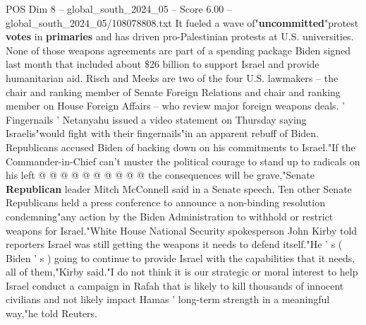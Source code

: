 \begin{textsample}{POS Dim 8 – global\_south\_2024\_05 – Score 6.00 – global\_south\_2024\_05/108078808.txt}
It fueled a wave of"\textbf{uncommitted}"protest \textbf{votes} in \textbf{primaries} and has driven pro-Palestinian protests at U.S. universities.
None of those weapons agreements are part of a spending package Biden signed last month that included about \$26 billion to support Israel and provide humanitarian aid.
Risch and Meeks are two of the four U.S. lawmakers -- the chair and ranking member of Senate Foreign Relations and chair and ranking member on House Foreign Affairs -- who review major foreign weapons deals. ' Fingernails ' Netanyahu issued a video statement on Thursday saying Israelis"would fight with their fingernails"in an apparent rebuff of Biden.
Republicans accused Biden of backing down on his commitments to Israel."If the Commander-in-Chief can't muster the political courage to stand up to radicals on his left @ @ @ @ @ @ @ @ @ @ the consequences will be grave,"Senate \textbf{Republican} leader Mitch McConnell said in a Senate speech.
Ten other Senate Republicans held a press conference to announce a non-binding resolution condemning"any action by the Biden Administration to withhold or restrict weapons for Israel."White House National Security spokesperson John Kirby told reporters Israel was still getting the weapons it needs to defend itself."He ' s ( Biden ' s ) going to continue to provide Israel with the capabilities that it needs, all of them,"Kirby said."I do not think it is our strategic or moral interest to help Israel conduct a campaign in Rafah that is likely to kill thousands of innocent civilians and not likely impact Hamas ' long-term strength in a meaningful way,"he told Reuters.

\end{textsample}
